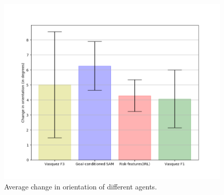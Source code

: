 \begin{figure}[htbp]
	\centering
	\includegraphics[width=0.7\linewidth]{plots/plot_without_outliers/ucy_inter_irl_no_outliers/compute_trajectory_smoothness_ucy_no_outlier_inter_irl_7743_8397_8468_5181.png}
	\caption{Average change in orientation of different agents.}
	\label{fig:inter_IRL-change_in_orientation_avg}
\end{figure}


